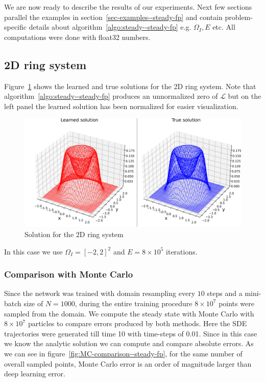 We are now ready to describe the results of our experiments. Next few sections parallel the examples in section~\ref{sec-examples--steady-fp} and contain problem-specific details about algorithm~\ref{algo:steady--steady-fp} e.g. $\Omega_I, E$ etc. All computations were done with float32 numbers.
\subsection{2D ring system}Figure~\ref{fig:2D-surface--steady-fp} shows the learned and true solutions for the 2D ring system. Note that algorithm~\ref{algo:steady--steady-fp} produces an unnormalized zero of $\mathcal L$ but on the left panel the learned solution has been normalized for easier visualization. 
\begin{figure}[!ht]
    \centering
\includegraphics[scale=0.6
]{steady-fp/plots/2D-surface.png}
    \caption{Solution for the 2D ring system}
    \label{fig:2D-surface--steady-fp}
\end{figure}
In this case we use $\Omega_I=[-2,2]^2$ and $E=8\times10^5$ iterations. 
\subsubsection{Comparison with Monte Carlo}\label{sssec-MC-comparison--steady-fp} Since the network was trained with domain resampling every $10$ steps and a mini-batch size of $N=1000$, during the entire training procedure $8\times10^7$ points were sampled from the domain. We compute the steady state with Monte Carlo with $8\times10^7$ particles to compare errors produced by both methods. Here the SDE trajectories were generated till time 10 with time-steps of 0.01. Since in this case we know the analytic solution we can compute and compare absolute errors. As we can see in figure~\ref{fig:MC-comparison--steady-fp}, for the same number of overall sampled points, Monte Carlo error is an order of magnitude larger than deep learning error. 

